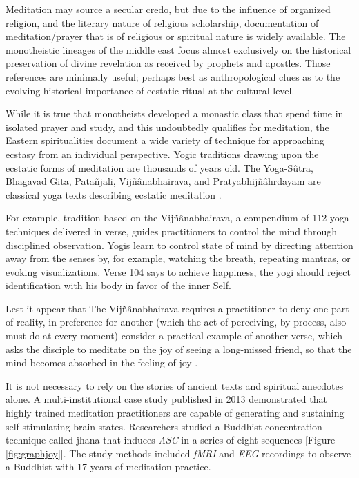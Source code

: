 \documentclass{UIdahoMastersThesis}
\begin{document}
Meditation may source a secular credo, but due to the influence of organized religion, and the literary nature of religious scholarship, documentation of meditation/prayer that is of religious or spiritual nature is widely available. The monotheistic lineages of the middle east focus almost exclusively on the historical preservation of divine revelation as received by prophets and apostles. Those references are minimally useful; perhaps best as anthropological clues as to the evolving historical importance of ecstatic ritual at the cultural level.
 
While it is true that monotheists developed a monastic class that spend time in isolated prayer and study, and this undoubtedly qualifies for meditation, the Eastern spiritualities document a wide variety of technique for approaching ecstasy from an individual perspective. Yogic traditions drawing upon the ecstatic forms of meditation are thousands of years old. The Yoga-S\^{u}tra, Bhagavad Gita, Pata\~{n}jali, Vij\~{n}\^{a}nabhairava, and Pratyabhij\~{n}\^{a}hrdayam are classical yoga texts describing ecstatic meditation \cite{waelde_dissociation_2004}.

For example, tradition based on the Vij\~{n}\^{a}nabhairava, a compendium of 112 yoga techniques delivered in verse, guides practitioners to control the mind through disciplined observation. Yogis learn to control state of mind by directing attention away from the senses by, for example, watching the breath, repeating mantras, or evoking visualizations. Verse 104 says to achieve happiness, the yogi should reject identification with his body in favor of the inner Self. 

Lest it appear that The Vij\~{n}\^{a}nabhairava requires a practitioner to deny one part of reality, in preference for another (which the act of perceiving, by process, also must do at every moment) consider a practical example of another verse, which asks the disciple to meditate on the joy of seeing a long-missed friend, so that the mind becomes absorbed in the feeling of joy \cite{singh_vijnanabhairava_2002}.

It is not necessary to rely on the stories of ancient texts and spiritual anecdotes alone. A multi-institutional case study published in 2013 demonstrated that highly trained meditation practitioners are capable of generating and sustaining self-stimulating brain states. Researchers studied a Buddhist concentration technique called jhana that induces \textit{\ac{ASC}} in a series of eight sequences [Figure \ref{fig:graphjoy}]. The study methods included \textit{\ac{fMRI}} and \textit{\ac{EEG}} recordings to observe a Buddhist with 17 years of meditation practice. 
\end{document}
